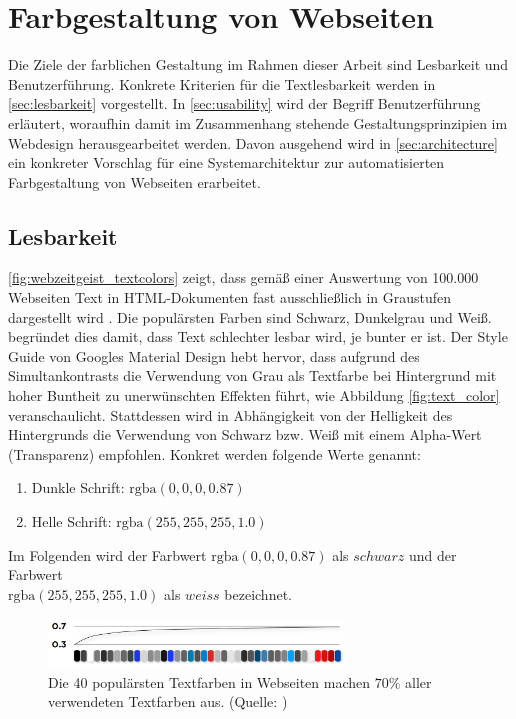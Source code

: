 \section{Farbgestaltung von Webseiten}
\label{sec:farbgestaltung}
Die Ziele der farblichen Gestaltung im Rahmen dieser Arbeit sind Lesbarkeit und Benutzerführung. Konkrete Kriterien für die Textlesbarkeit werden in \autoref{sec:lesbarkeit} vorgestellt. In  \autoref{sec:usability} wird der Begriff Benutzerführung erläutert, woraufhin damit im Zusammenhang stehende Gestaltungsprinzipien im Webdesign herausgearbeitet werden. Davon ausgehend wird in \autoref{sec:architecture} ein konkreter Vorschlag für eine Systemarchitektur zur automatisierten Farbgestaltung von Webseiten erarbeitet.

\subsection{Lesbarkeit}
\label{sec:lesbarkeit}


\autoref{fig:webzeitgeist_textcolors} zeigt, dass gemäß einer Auswertung von 100.000 Webseiten Text in HTML-Dokumenten fast ausschließlich in Graustufen dargestellt wird \citep{webzeitgeist}. Die populärsten Farben sind Schwarz, Dunkelgrau und Weiß. \citet{webdesign} begründet dies damit, dass Text schlechter lesbar wird, je bunter er ist. Der Style Guide von Googles Material Design \citep{google} hebt hervor, dass aufgrund des Simultankontrasts die Verwendung von Grau als Textfarbe bei Hintergrund mit hoher Buntheit zu unerwünschten Effekten führt, wie Abbildung \ref{fig:text_color} veranschaulicht. Stattdessen wird in Abhängigkeit von der Helligkeit des Hintergrunds die Verwendung von Schwarz bzw. Weiß mit einem Alpha-Wert (Transparenz) empfohlen. Konkret werden folgende Werte genannt:
\begin{enumerate}
	\item Dunkle Schrift: $\text{rgba}(0, 0, 0, 0.87)$
	\item Helle Schrift: $\text{rgba}(255, 255, 255, 1.0)$
\end{enumerate}

Im Folgenden wird der Farbwert $\text{rgba}(0, 0, 0, 0.87)$ als $schwarz$ und der Farbwert\\$\text{rgba}(255, 255, 255, 1.0)$ als $weiss$ bezeichnet.

\begin{figure}[b]
	\centering
	\includegraphics[width=0.7\textwidth]{img/webzeitgeist_textcolors.png}
	\caption{Die 40 populärsten Textfarben in Webseiten machen $70\%$ aller verwendeten Textfarben aus. (Quelle: \citep{webzeitgeist})}
	\label{fig:webzeitgeist_textcolors}
\end{figure}

